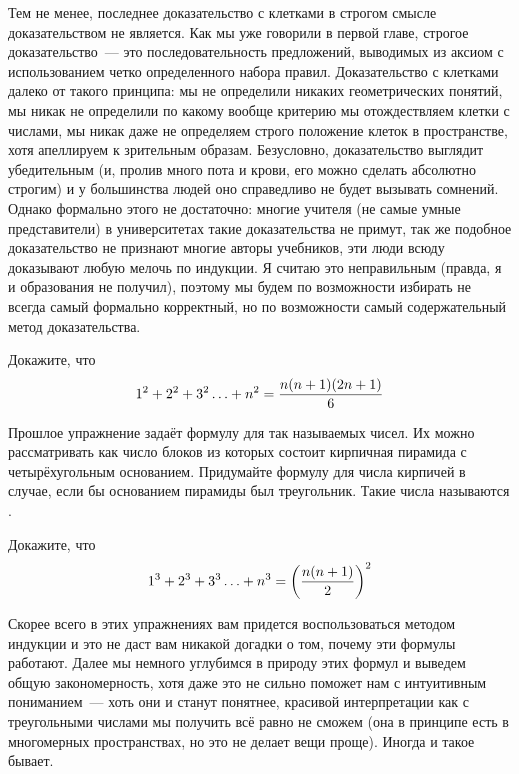 Тем не менее, последнее доказательство с клетками в строгом смысле доказательством не является. Как мы уже говорили в первой главе, строгое доказательство~--- это последовательность предложений, выводимых из аксиом с использованием четко определенного набора правил. Доказательство с клетками далеко от такого принципа: мы не определили никаких геометрических понятий, мы никак не определили по какому вообще критерию мы отождествляем клетки с числами, мы никак даже не определяем строго положение клеток в пространстве, хотя апеллируем к зрительным образам. Безусловно, доказательство выглядит убедительным (и, пролив много пота и крови, его можно сделать абсолютно строгим) и у большинства людей оно справедливо не будет вызывать сомнений. Однако формально этого не достаточно: многие учителя (не самые умные представители) в университетах такие доказательства не примут, так же подобное доказательство не признают многие авторы учебников, эти люди всюду доказывают любую мелочь по индукции. Я считаю это неправильным (правда, я и образования не получил), поэтому мы будем по возможности избирать не всегда самый формально корректный, но по возможности самый содержательный метод доказательства.

\begin{exercise}
Докажите, что
$$1^2 + 2^2 +3^2 \ldots + n^2 = {n(n+1)(2n+1)\over 6}$$
\end{exercise}

\begin{exercise}
Прошлое упражнение задаёт формулу для так называемых  чисел. Их можно рассматривать как число блоков из которых состоит кирпичная пирамида с четырёхугольным основанием. Придумайте формулу для числа кирпичей в случае, если бы основанием пирамиды был треугольник. Такие числа называются .
\end{exercise}

\begin{exercise}
Докажите, что
$$1^3 + 2^3 +3^3 \ldots + n^3 = \left({n(n+1)\over 2}\right)^2$$
\end{exercise}

Скорее всего в этих упражнениях вам придется воспользоваться методом индукции и это не даст вам никакой догадки о том, почему эти формулы работают. Далее мы немного углубимся в природу этих формул и выведем общую закономерность, хотя даже это не сильно поможет нам с интуитивным пониманием~--- хоть они и станут понятнее, красивой интерпретации как с треугольными числами мы получить всё равно не сможем (она в принципе есть в многомерных пространствах, но это не делает вещи проще). Иногда и такое бывает.

